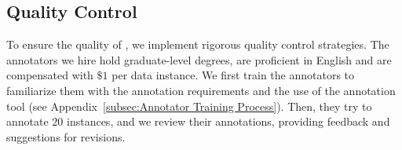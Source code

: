 \subsection{Quality Control}
To ensure the quality of \ourdataset, we implement rigorous quality control strategies.
The annotators we hire hold graduate-level degrees, are proficient in English and are compensated with $\$1$ per data instance. 
We first train the annotators to familiarize them with the annotation requirements and the use of the annotation tool (see Appendix~\ref{subsec:Annotator Training Process}). 
Then, they try to annotate $20$ instances, and we review their annotations, providing feedback and suggestions for revisions.


